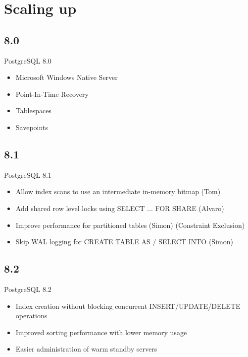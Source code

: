 \documentclass[t,10pt]{beamer}
\begin{document}
\section{Scaling up}
\subsection{8.0}
\begin{frame}{PostgreSQL 8.0}
  \begin{itemize}%
  \item Microsoft Windows Native Server
  \item Point-In-Time Recovery
  \item Tablespaces
  \item Savepoints
  \end{itemize}
\end{frame}
\subsection{8.1}
\begin{frame}{PostgreSQL 8.1}
  \begin{itemize}%
  \item Allow index scans to use an intermediate in-memory bitmap (Tom)
  \item Add shared row level locks using SELECT ... FOR SHARE (Alvaro)
  \item Improve performance for partitioned tables (Simon) (Constraint Exclusion)
  \item Skip WAL logging for CREATE TABLE AS / SELECT INTO (Simon)
  \end{itemize}
\end{frame}
\subsection{8.2}
\begin{frame}{PostgreSQL 8.2}
  \begin{itemize}%
  \item Index creation without blocking concurrent INSERT/UPDATE/DELETE operations
  \item Improved sorting performance with lower memory usage
  \item Easier administration of warm standby servers
  \end{itemize}
\end{frame}
\end{document}
